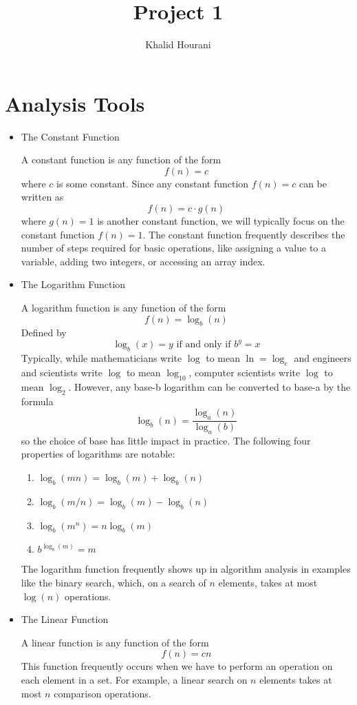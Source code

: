 \documentclass[a4paper]{article}
\title{Project 1}
\author{Khalid Hourani}
\begin{document}
\maketitle
\section{Analysis Tools}
\begin{itemize}
  \item The Constant Function

  A constant function is any function of the form \[f(n) = c\] where $c$ is some constant. Since any constant function $f(n) = c$ can be written as \[f(n) = c \cdot g(n)\] where $g(n) = 1$ is another constant function, we will typically focus on the constant function $f(n)=1$. The constant function frequently describes the number of steps required for basic operations, like assigning a value to a variable, adding two integers, or accessing an array index. 

  \item The Logarithm Function

  A logarithm function is any function of the form \[f(n)=\log_b(n)\] Defined by \[\log_b(x)=y\text{ if and only if } b^y=x\] Typically, while mathematicians write $\log$ to mean $\ln=\log_e$ and engineers and scientists write $\log$ to mean $\log_{10}$, computer scientists write $\log$ to mean $\log_2$. However, any base-b logarithm can be converted to base-a by the formula \[\log_b(n)=\frac{\log_a(n)}{\log_a(b)}\] so the choice of base has little impact in practice. The following four properties of logarithms are notable:
  \begin{enumerate}
  \item $\log_b(mn) = \log_b(m)+\log_b(n)$
  \item $\log_b(m/n) = \log_b(m) - \log_b(n)$
  \item $\log_b(m^n) = n\log_b(m)$
  \item $b^{\log_b(m)} = m$
  \end{enumerate}

  The logarithm function frequently shows up in algorithm analysis in examples like the binary search, which, on a search of $n$ elements, takes at most $\log(n)$ operations.
  \item The Linear Function

  A linear function is any function of the form \[f(n)=cn\] This function frequently occurs when we have to perform an operation on each element in a set. For example, a linear search on $n$ elements takes at most $n$ comparison operations.


\end{itemize}
\end{document}
